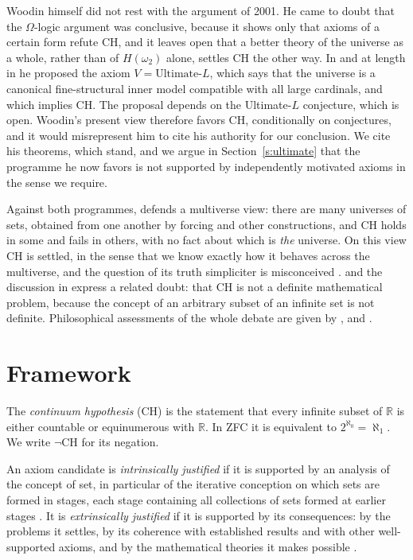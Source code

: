 \documentclass{situationist-preprint}
\begin{document}
Woodin himself did not rest with the argument of 2001. He came to doubt that the $\Omega$-logic argument was conclusive, because it shows only that axioms of a certain form refute CH, and it leaves open that a better theory of the universe as a whole, rather than of $H(\omega_2)$ alone, settles CH the other way. In \citet{Woodin2010} and at length in \citet{Woodin2017} he proposed the axiom $V = \text{Ultimate-}L$, which says that the universe is a canonical fine-structural inner model compatible with all large cardinals, and which implies CH. The proposal depends on the Ultimate-$L$ conjecture, which is open. Woodin's present view therefore favors CH, conditionally on conjectures, and it would misrepresent him to cite his authority for our conclusion. We cite his theorems, which stand, and we argue in Section~\ref{s:ultimate} that the programme he now favors is not supported by independently motivated axioms in the sense we require.

Against both programmes, \citet{Hamkins2012} defends a multiverse view: there are many universes of sets, obtained from one another by forcing and other constructions, and CH holds in some and fails in others, with no fact about which is \emph{the} universe. On this view CH is settled, in the sense that we know exactly how it behaves across the multiverse, and the question of its truth simpliciter is misconceived \citep{Hamkins2015}. \citet{Feferman1999} and the discussion in \citet{FFMS2000} express a related doubt: that CH is not a definite mathematical problem, because the concept of an arbitrary subset of an infinite set is not definite. Philosophical assessments of the whole debate are given by \citet{Maddy1988a,Maddy1988b,Maddy2011}, \citet{Koellner2006} and \citet{Steel2014}.

\section{Framework}\label{s:framework}

\begin{definition}\label{d:ch}
The \emph{continuum hypothesis} (CH) is the statement that every infinite subset of $\mathbb{R}$ is either countable or equinumerous with $\mathbb{R}$. In ZFC it is equivalent to $2^{\aleph_0} = \aleph_1$. We write $\neg$CH for its negation.
\end{definition}

\begin{definition}\label{d:just}
An axiom candidate is \emph{intrinsically justified} if it is supported by an analysis of the concept of set, in particular of the iterative conception on which sets are formed in stages, each stage containing all collections of sets formed at earlier stages \citep{Boolos1971}. It is \emph{extrinsically justified} if it is supported by its consequences: by the problems it settles, by its coherence with established results and with other well-supported axioms, and by the mathematical theories it makes possible \citep{Godel1964,Maddy1988a}.
\end{definition}
\end{document}
